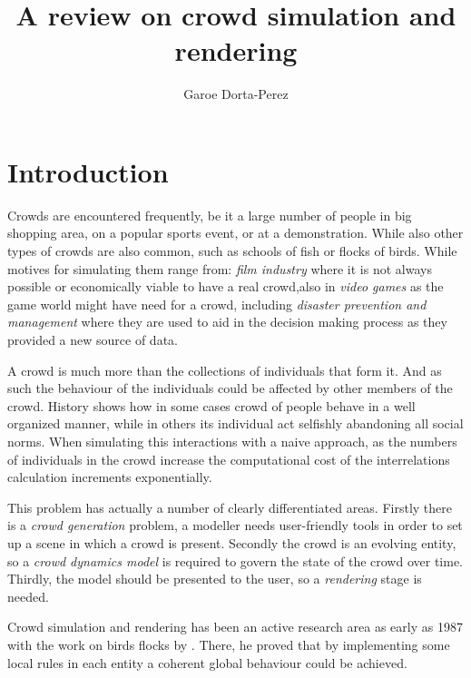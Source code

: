 \documentclass[conference]{acmsiggraph}
\title{A review on crowd simulation and rendering}
\author{Garoe Dorta-Perez}
\begin{document}
\maketitle



\section{Introduction}

Crowds are encountered frequently, be it a large number of people in big shopping area, on a popular sports event, or at a demonstration.
While also other types of crowds are also common, such as schools of fish or flocks of birds.
While motives for simulating them range from: \textit{film industry} where it is not always possible or economically viable to have a real crowd,also in \textit{video games} as the game world might have need for a crowd, including \textit{disaster prevention and management} where they are used to aid in the decision making process as they provided a new source of data. 

A crowd is much more than the collections of individuals that form it.
And as such the behaviour of the individuals could be affected by other members of the crowd.
History shows how in some cases crowd of people behave in a well organized manner, while in others its individual act selfishly abandoning all social norms.
When simulating this interactions with a naive approach, as the numbers of individuals in the crowd increase the computational cost of the interrelations calculation increments exponentially.

This problem has actually a number of clearly differentiated areas.
Firstly there is a \textit{crowd generation} problem, a modeller needs user-friendly tools in order to set up a scene in which a crowd is present.
Secondly the crowd is an evolving entity, so a \textit{crowd dynamics model} is required to govern the state of the crowd over time.
Thirdly, the model should be presented to the user, so a \textit{rendering} stage is needed.

Crowd simulation and rendering has been an active research area as early as 1987 with the work on birds flocks by \cite{Reynolds1987}.
There, he proved that by implementing some local rules in each entity a coherent global behaviour could be achieved.
\end{document}

